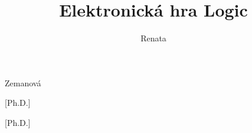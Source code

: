
\usepackage[
  czech-english,		%
%
  bachelor,			%
%
	center,			    %
%
]{thesis}   %


\author{Renata}{Zemanová}



[Ph.D.]

[Ph.D.]

\title[Electronic game Logic]{Elektronická hra Logic}

